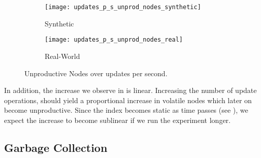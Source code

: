 \documentclass[abstracton,12pt]{scrartcl}
\theoremstyle{definition}
\begin{document}
\begin{figure}[h]
  \centering
  \begin{subfigure}{0.49\linewidth}
    \centering
    \caption{Synthetic}
    \texttt{[image: updates\_p\_s\_unprod\_nodes\_synthetic]}
    \label{fig:upt_unprod_nodes_synthetic}
  \end{subfigure}
  \begin{subfigure}{0.49\linewidth}
    \centering
    \caption{Real-World}
    \texttt{[image: updates\_p\_s\_unprod\_nodes\_real]}
    \label{fig:upt_unprod_nodes_real}
  \end{subfigure}
  \vspace{-0.65cm}
  \caption[Unproductive Nodes over updates per second]{
  Unproductive Nodes over updates per second.}
\end{figure}

In addition, the increase we observe in 
 is linear.
Increasing the number of update operations, should yield
a proportional increase in volatile nodes which later on become
unproductive. Since the index becomes static as time passes (see ),
we expect the increase to become sublinear if we run the experiment longer.



\subsection{Garbage Collection}

\label{sec:gc-experiment}
\end{document}
